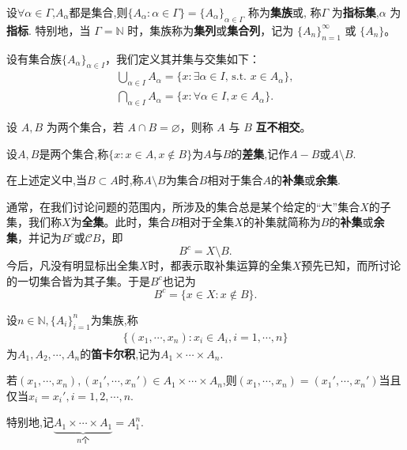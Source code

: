 \documentclass[../../main.tex]{subfiles}%
\begin{document}
\begin{definition}
设$\forall \alpha \in \Gamma$,$A_\alpha$都是集合,则\(\{A_\alpha: \alpha \in \Gamma\}=\{A_{\alpha}\}_{\alpha \in \varGamma}\) 称为\textbf{集族}或, 称\(\varGamma\) 为\textbf{指标集},\(\alpha\) 为\textbf{指标}. 特别地，当 \(\varGamma = \mathbb{N}\) 时，集族称为\textbf{集列}或\textbf{集合列}，记为 \(\{A_n\}_{n = 1}^{\infty}\) 或 \(\{A_n\}\)。
\end{definition}

\begin{definition}
设有集合族\(\{A_{\alpha}\}_{\alpha\in I}\)，我们定义其并集与交集如下：
\begin{gather*}
\bigcup_{\alpha\in I}A_{\alpha}=\{x:\exists \alpha \in I,\,\text{s.t.}\,\,x\in A_{\alpha}\},\\
\bigcap_{\alpha\in I}A_{\alpha}=\{x:\forall \alpha \in I,x\in A_{\alpha}\}.
\end{gather*}

设 \(A, B\) 为两个集合，若 \(A \cap B = \varnothing\)，则称 \(A\) 与 \(B\) \textbf{互不相交}。
\end{definition}

\begin{definition}
设$A,B$是两个集合,称$\{x:x\in A,x\notin B\}$为$A$与$B$的\textbf{差集},记作$A-B$或$A\setminus B$.

在上述定义中,当$B\subset A$时,称$A\setminus B$为集合$B$相对于集合$A$的\textbf{补集}或\textbf{余集}.

通常，在我们讨论问题的范围内，所涉及的集合总是某个给定的“大”集合\(X\)的子集，我们称\(X\)为\textbf{全集}。此时，集合\(B\)相对于全集\(X\)的补集就简称为\(B\)的\textbf{补集}或\textbf{余集}，并记为\(B^c\)或\(\mathscr{C} B\)，即
\[B^c = X\setminus  B.\]
今后，凡没有明显标出全集\(X\)时，都表示取补集运算的全集\(X\)预先已知，而所讨论的一切集合皆为其子集。于是\(B^c\)也记为
\[B^c = \{x\in X:x\notin B\}.\]
\end{definition}

\begin{definition}
设$n\in \mathbb{N},\{A_i\}_{i=1}^n$为集族,称
\begin{align*}
\{(x_1, \cdots, x_n) : x_i \in A_i, i = 1, \cdots, n\}
\end{align*}
为$A_1,A_2,\cdots,A_n$的\textbf{笛卡尔积},记为$A_1 \times \cdots \times A_n .$

若$(x_1, \cdots, x_n),(x_1', \cdots, x_n')\in A_1 \times \cdots \times A_n$,则\((x_1, \cdots, x_n)=(x_1', \cdots, x_n')\)当且仅当\(x_i = x_i',i=1,2,\cdots,n.\)

特别地,记$\underset{n\text{个}}{\underbrace{A_1\times \cdots \times A_1}}=A_1^n.$
\end{definition}
\end{document}
